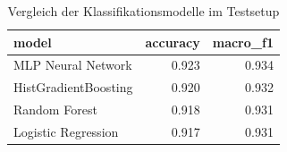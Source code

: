 \begin{table}
\caption{Vergleich der Klassifikationsmodelle im Testsetup}
\label{tab:modelle_ergebnisse}
\begin{tabular}{lrr}
\toprule
model & accuracy & macro_f1 \\
\midrule
MLP Neural Network & 0.923 & 0.934 \\
HistGradientBoosting & 0.920 & 0.932 \\
Random Forest & 0.918 & 0.931 \\
Logistic Regression & 0.917 & 0.931 \\
\bottomrule
\end{tabular}
\end{table}
